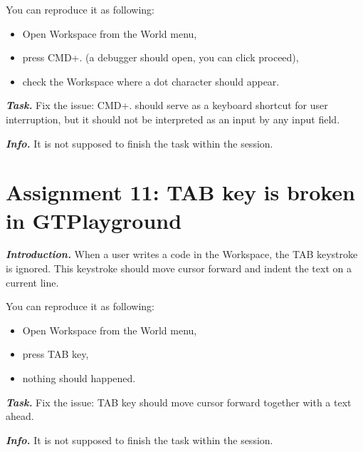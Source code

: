\documentclass[table,a4paper]{article}
\newcommand{\myparagraph}[1]{\vspace{0.3em}\noindent \textbf{\textit{#1.}}}
\begin{document}
You can reproduce it as following:
\begin{itemize}
\item Open Workspace from the World menu,
\item press CMD+. (a debugger should open, you can click proceed),
\item check the Workspace where a dot character should appear. 
\end{itemize}

\myparagraph{Task} Fix the issue: CMD+. should serve as a keyboard shortcut for user interruption, but it should not be interpreted as an input by any input field.

\myparagraph{Info} It is not supposed to finish the task within the session.


\clearpage{}
\section{Assignment 11: TAB key is broken in GTPlayground}
\label{sec:a11}

\myparagraph{Introduction} When a user writes a code in the Workspace, the TAB keystroke is ignored. This keystroke should move cursor forward and indent the text on a current line. 

You can reproduce it as following:
\begin{itemize}
\item Open Workspace from the World menu,
\item press TAB key,
\item nothing should happened.
\end{itemize}

\myparagraph{Task} Fix the issue: TAB key should move cursor forward together with a text ahead.

\myparagraph{Info} It is not supposed to finish the task within the session.
\end{document}
